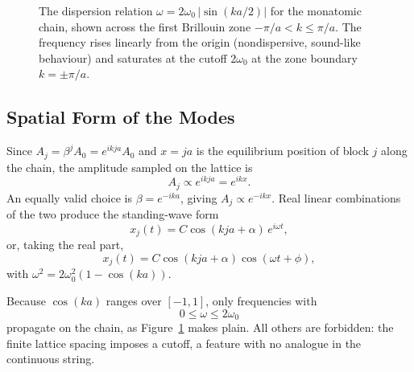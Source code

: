 \begin{figure}[H]
    \centering
    \caption{The dispersion relation $\omega = 2\omega_0\,|\sin(ka/2)|$ for the monatomic chain, shown across the first Brillouin zone $-\pi/a < k \le \pi/a$. The frequency rises linearly from the origin (nondispersive, sound-like behaviour) and saturates at the cutoff $2\omega_0$ at the zone boundary $k = \pm\pi/a$.}
    \label{fig:monatomic-dispersion}
\end{figure}

\subsection{Spatial Form of the Modes}

Since $A_j = \beta^j A_0 = e^{ikja} A_0$ and $x = j a$ is the equilibrium position of block $j$ along the chain, the amplitude sampled on the lattice is
\begin{equation}
    A_j \propto e^{ikja} = e^{ikx}.
\end{equation}
An equally valid choice is $\beta = e^{-ika}$, giving $A_j \propto e^{-ikx}$. Real linear combinations of the two produce the standing-wave form
\begin{equation}
    x_j(t) = C \cos(k j a + \alpha)\, e^{i\omega t},
\end{equation}
or, taking the real part,
\begin{equation}
    x_j(t) = C \cos(k j a + \alpha) \cos(\omega t + \phi),
\end{equation}
with $\omega^2 = 2\omega_0^2(1 - \cos(ka))$.

\begin{fact}
Because $\cos(ka)$ ranges over $[-1, 1]$, only frequencies with
\begin{equation}
    0 \leq \omega \leq 2\omega_0
\end{equation}
propagate on the chain, as Figure~\ref{fig:monatomic-dispersion} makes plain. All others are forbidden: the finite lattice spacing imposes a cutoff, a feature with no analogue in the continuous string.
\end{fact}

